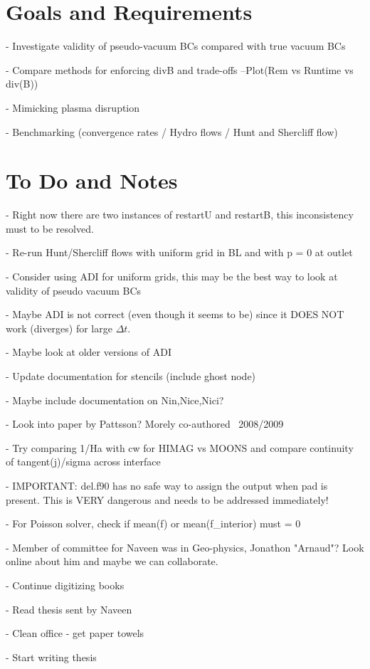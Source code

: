 \documentclass[11pt]{article}
\begin{document}
\section{Goals and Requirements}

- Investigate validity of pseudo-vacuum BCs compared with true vacuum BCs

- Compare methods for enforcing divB and trade-offs
--Plot(Rem vs Runtime vs div(B))

- Mimicking plasma disruption

- Benchmarking (convergence rates / Hydro flows / Hunt and Shercliff flow)

\section{To Do and Notes}
- Right now there are two instances of restartU and restartB, this inconsistency must to be resolved.

- Re-run Hunt/Shercliff flows with uniform grid in BL and with p = 0 at outlet

- Consider using ADI for uniform grids, this may be the best way to look at validity of pseudo vacuum BCs

- Maybe ADI is not correct (even though it seems to be) since it DOES NOT work (diverges) for large $\Delta t$.

- Maybe look at older versions of ADI

- Update documentation for stencils (include ghost node)

- Maybe include documentation on Nin,Nice,Nici?

- Look into paper by Pattsson? Morely co-authored ~2008/2009

- Try comparing 1/Ha with cw for HIMAG vs MOONS and compare continuity of tangent(j)/sigma across interface

- IMPORTANT: del.f90 has no safe way to assign the output when pad is present. This is VERY dangerous and needs to be addressed immediately!

- For Poisson solver, check if mean(f) or mean(f\_interior) must = 0

- Member of committee for Naveen was in Geo-physics, Jonathon "Arnaud"? Look online about him and maybe we can collaborate.

- Continue digitizing books

- Read thesis sent by Naveen

- Clean office - get paper towels

- Start writing thesis
\end{document}
